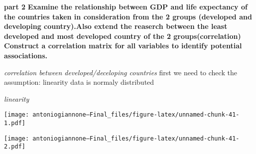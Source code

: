 \documentclass[
]{article}
\newenvironment{Shaded}{\begin{snugshade}}{\end{snugshade}}
\newcommand{\AttributeTok}[1]{\textcolor[rgb]{0.13,0.29,0.53}{#1}}
\newcommand{\CommentTok}[1]{\textcolor[rgb]{0.56,0.35,0.01}{\textit{#1}}}
\newcommand{\FunctionTok}[1]{\textcolor[rgb]{0.13,0.29,0.53}{\textbf{#1}}}
\newcommand{\NormalTok}[1]{#1}
\newcommand{\SpecialCharTok}[1]{\textcolor[rgb]{0.81,0.36,0.00}{\textbf{#1}}}
\newcommand{\StringTok}[1]{\textcolor[rgb]{0.31,0.60,0.02}{#1}}
\begin{document}
\textbf{part 2} \textbf{Examine the relationship between GDP and life
expectancy of the countries taken in consideration from the 2 groups
(developed and developing country).Also extend the reaserch between the
least developed and most developed country of the 2 groups(correlation)
Construct a correlation matrix for all variables to identify potential
associations.}

\emph{correlation between developed/deceloping countries} first we need
to check the assumption: linearity data is normaly distributed

\emph{linearity}

\begin{Shaded}
\end{Shaded}

\texttt{[image: antoniogiannone---Final\_files/figure-latex/unnamed-chunk-41-1.pdf]}

\begin{Shaded}
\end{Shaded}

\texttt{[image: antoniogiannone---Final\_files/figure-latex/unnamed-chunk-41-2.pdf]}
\end{document}
